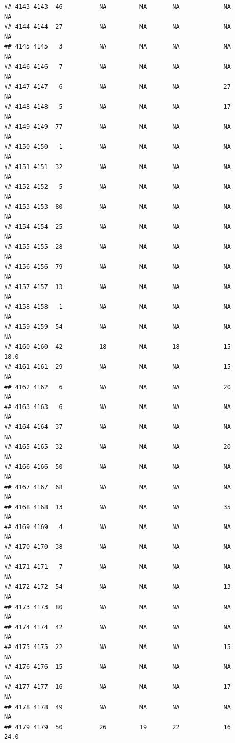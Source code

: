\documentclass[man]{apa6}
\begin{document}
\begin{verbatim}
## 4143 4143  46          NA         NA       NA            NA       NA
## 4144 4144  27          NA         NA       NA            NA       NA
## 4145 4145   3          NA         NA       NA            NA       NA
## 4146 4146   7          NA         NA       NA            NA       NA
## 4147 4147   6          NA         NA       NA            27       NA
## 4148 4148   5          NA         NA       NA            17       NA
## 4149 4149  77          NA         NA       NA            NA       NA
## 4150 4150   1          NA         NA       NA            NA       NA
## 4151 4151  32          NA         NA       NA            NA       NA
## 4152 4152   5          NA         NA       NA            NA       NA
## 4153 4153  80          NA         NA       NA            NA       NA
## 4154 4154  25          NA         NA       NA            NA       NA
## 4155 4155  28          NA         NA       NA            NA       NA
## 4156 4156  79          NA         NA       NA            NA       NA
## 4157 4157  13          NA         NA       NA            NA       NA
## 4158 4158   1          NA         NA       NA            NA       NA
## 4159 4159  54          NA         NA       NA            NA       NA
## 4160 4160  42          18         NA       18            15     18.0
## 4161 4161  29          NA         NA       NA            15       NA
## 4162 4162   6          NA         NA       NA            20       NA
## 4163 4163   6          NA         NA       NA            NA       NA
## 4164 4164  37          NA         NA       NA            NA       NA
## 4165 4165  32          NA         NA       NA            20       NA
## 4166 4166  50          NA         NA       NA            NA       NA
## 4167 4167  68          NA         NA       NA            NA       NA
## 4168 4168  13          NA         NA       NA            35       NA
## 4169 4169   4          NA         NA       NA            NA       NA
## 4170 4170  38          NA         NA       NA            NA       NA
## 4171 4171   7          NA         NA       NA            NA       NA
## 4172 4172  54          NA         NA       NA            13       NA
## 4173 4173  80          NA         NA       NA            NA       NA
## 4174 4174  42          NA         NA       NA            NA       NA
## 4175 4175  22          NA         NA       NA            15       NA
## 4176 4176  15          NA         NA       NA            NA       NA
## 4177 4177  16          NA         NA       NA            17       NA
## 4178 4178  49          NA         NA       NA            NA       NA
## 4179 4179  50          26         19       22            16     24.0

\end{verbatim}
\end{document}
